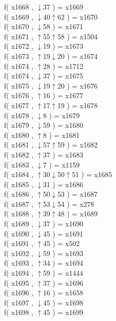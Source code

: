 f( x1668 , $\downarrow$37 ) = x1669 \\
f( x1669 , $\downarrow$40$\uparrow$62 ) = x1670 \\
f( x1670 , $\downarrow$58 ) = x1671 \\
f( x1671 , $\uparrow$55$\uparrow$58 ) = x1504 \\
f( x1672 , $\downarrow$19 ) = x1673 \\
f( x1673 , $\uparrow$19$\downarrow$20 ) = x1674 \\
f( x1674 , $\uparrow$28 ) = x1712 \\
f( x1674 , $\downarrow$37 ) = x1675 \\
f( x1675 , $\downarrow$19$\uparrow$20 ) = x1676 \\
f( x1676 , $\uparrow$16 ) = x1677 \\
f( x1677 , $\uparrow$17$\uparrow$19 ) = x1678 \\
f( x1678 , $\downarrow$8 ) = x1679 \\
f( x1679 , $\downarrow$59 ) = x1680 \\
f( x1680 , $\uparrow$8 ) = x1681 \\
f( x1681 , $\downarrow$57$\uparrow$59 ) = x1682 \\
f( x1682 , $\uparrow$37 ) = x1683 \\
f( x1683 , $\downarrow$7 ) = x1159 \\
f( x1684 , $\uparrow$30$\downarrow$50$\uparrow$51 ) = x1685 \\
f( x1685 , $\downarrow$31 ) = x1686 \\
f( x1686 , $\uparrow$50$\downarrow$53 ) = x1687 \\
f( x1687 , $\uparrow$53$\downarrow$54 ) = x278 \\
f( x1688 , $\uparrow$39$\uparrow$48 ) = x1689 \\
f( x1689 , $\downarrow$37 ) = x1690 \\
f( x1690 , $\downarrow$45 ) = x1691 \\
f( x1691 , $\uparrow$45 ) = x502 \\
f( x1692 , $\downarrow$59 ) = x1693 \\
f( x1693 , $\uparrow$34 ) = x1694 \\
f( x1694 , $\uparrow$59 ) = x1444 \\
f( x1695 , $\uparrow$37 ) = x1696 \\
f( x1696 , $\uparrow$16 ) = x1658 \\
f( x1697 , $\downarrow$45 ) = x1698 \\
f( x1698 , $\uparrow$45 ) = x1699 \\
